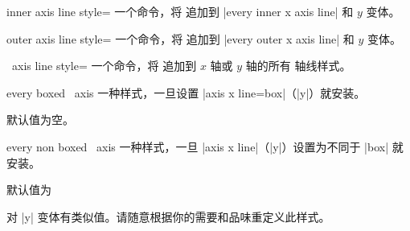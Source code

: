 \begin{pgfplotskey}{inner axis line style=}
    一个命令，将  追加到 |every inner x axis line|
    和 $y$ 变体。
\end{pgfplotskey}

\begin{pgfplotskey}{outer axis line style=}
    一个命令，将  追加到 |every outer x axis line|
    和 $y$ 变体。
\end{pgfplotskey}

\begin{pgfplotsxykey}{\x\ axis line style=}
    一个命令，将  追加到 $x$ 轴或 $y$ 轴的所有
    轴线样式。
\end{pgfplotsxykey}

\begin{pgfplotsxykey}{every boxed \x\ axis}
    一种样式，一旦设置 |axis x line=box|（|y|）就安装。

    默认值为空。
\end{pgfplotsxykey}

\begin{pgfplotsxykey}{every non boxed \x\ axis}
    一种样式，一旦 |axis x line|（|y|）设置为不同于 |box| 就安装。

    默认值为
\begin{codeexample}
\end{codeexample}
    \noindent 对 |y| 变体有类似值。请随意根据你的需要和品味重定义此样式。
\end{pgfplotsxykey}


